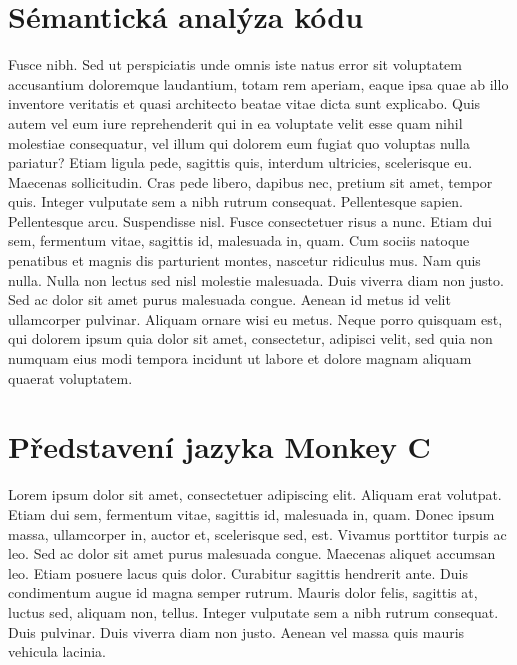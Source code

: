 \documentclass[czech,master,dept460,male,cpp,cpdeclaration]{diploma}
\begin{document}
\section{Sémantická analýza kódu}
Fusce nibh. Sed ut perspiciatis unde omnis iste natus error sit voluptatem accusantium doloremque laudantium, totam rem aperiam, eaque ipsa quae ab illo inventore veritatis et quasi architecto beatae vitae dicta sunt explicabo. Quis autem vel eum iure reprehenderit qui in ea voluptate velit esse quam nihil molestiae consequatur, vel illum qui dolorem eum fugiat quo voluptas nulla pariatur? Etiam ligula pede, sagittis quis, interdum ultricies, scelerisque eu. Maecenas sollicitudin. Cras pede libero, dapibus nec, pretium sit amet, tempor quis. Integer vulputate sem a nibh rutrum consequat. Pellentesque sapien. Pellentesque arcu. Suspendisse nisl. Fusce consectetuer risus a nunc. Etiam dui sem, fermentum vitae, sagittis id, malesuada in, quam. Cum sociis natoque penatibus et magnis dis parturient montes, nascetur ridiculus mus. Nam quis nulla. Nulla non lectus sed nisl molestie malesuada. Duis viverra diam non justo. Sed ac dolor sit amet purus malesuada congue. Aenean id metus id velit ullamcorper pulvinar. Aliquam ornare wisi eu metus. Neque porro quisquam est, qui dolorem ipsum quia dolor sit amet, consectetur, adipisci velit, sed quia non numquam eius modi tempora incidunt ut labore et dolore magnam aliquam quaerat voluptatem.




\section{Představení jazyka Monkey C}
Lorem ipsum dolor sit amet, consectetuer adipiscing elit. Aliquam erat volutpat. Etiam dui sem, fermentum vitae, sagittis id, malesuada in, quam. Donec ipsum massa, ullamcorper in, auctor et, scelerisque sed, est. Vivamus porttitor turpis ac leo. Sed ac dolor sit amet purus malesuada congue. Maecenas aliquet accumsan leo. Etiam posuere lacus quis dolor. Curabitur sagittis hendrerit ante. Duis condimentum augue id magna semper rutrum. Mauris dolor felis, sagittis at, luctus sed, aliquam non, tellus. Integer vulputate sem a nibh rutrum consequat. Duis pulvinar. Duis viverra diam non justo. Aenean vel massa quis mauris vehicula lacinia.
\end{document}
